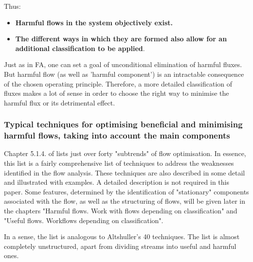 \documentclass[a4paper,11pt]{article}
\begin{document}
Thus:
\begin{itemize}
\item \textbf{Harmful flows in the system objectively exist.}
\item \textbf{The different ways in which they are formed also allow for an
  additional classification to be applied}.
\end{itemize}
Just as in FA, one can set a goal of unconditional elimination of harmful
fluxes. But harmful flow (as well as 'harmful component') is an intractable
consequence of the chosen operating principle. Therefore, a more detailed
classification of fluxes makes a lot of sense in order to choose the right way
to minimise the harmful flux or its detrimental effect.

\subsubsection{Typical techniques for optimising beneficial and minimising
  harmful flows, taking into account the main components}

Chapter 5.1.4. of \cite{B6} lists just over forty "subtrends" of flow
optimisation. In essence, this list is a fairly comprehensive list of
techniques to address the weaknesses identified in the flow analysis. These
techniques are also described in some detail and illustrated with examples. A
detailed description is not required in this paper. Some features, determined
by the identification of "stationary" components associated with the flow, as
well as the structuring of flows, will be given later in the chapters "Harmful
flows. Work with flows depending on classification" and "Useful flows.
Workflows depending on classification".

In a sense, the list is analogous to Altshuller's 40 techniques. The list is
almost completely unstructured, apart from dividing streams into useful and
harmful ones.
\end{document}
